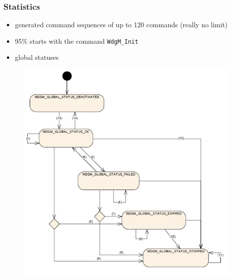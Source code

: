 \documentclass{beamer}
\begin{document}
\begin{frame}[fragile]
  \frametitle{Statistics}
  \begin{itemize}
    \item generated command sequences of up to 120 commands (really no limit)
    \item 95\% starts with the command \verb!WdgM_Init!
    \item global statuses
  \end{itemize}
\end{frame}

\begin{frame}
  \begin{figure}
    \includegraphics[keepaspectratio, width=0.7\linewidth]{globalstatuses}
  \end{figure}
\end{frame}

\end{document}
